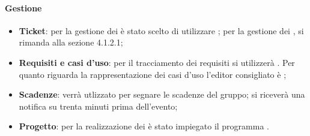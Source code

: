 	\paragraph{Gestione}
	\begin{itemize}
		\item \textbf{Ticket}: per la gestione dei  è stato scelto di utilizzare ; per la gestione dei , si rimanda alla sezione 4.1.2.1;
		\item \textbf{Requisiti e casi d'uso}: per il tracciamento dei requisiti si utilizzerà . Per quanto riguarda la rappresentazione dei casi d'uso l'editor consigliato è ; %
		\item \textbf{Scadenze}:  verrà utlizzato per segnare le scadenze del gruppo; si riceverà una notifica su  trenta minuti prima dell'evento;
		\item \textbf{Progetto}: per la realizzazione dei  è stato impiegato il programma .
	\end{itemize}